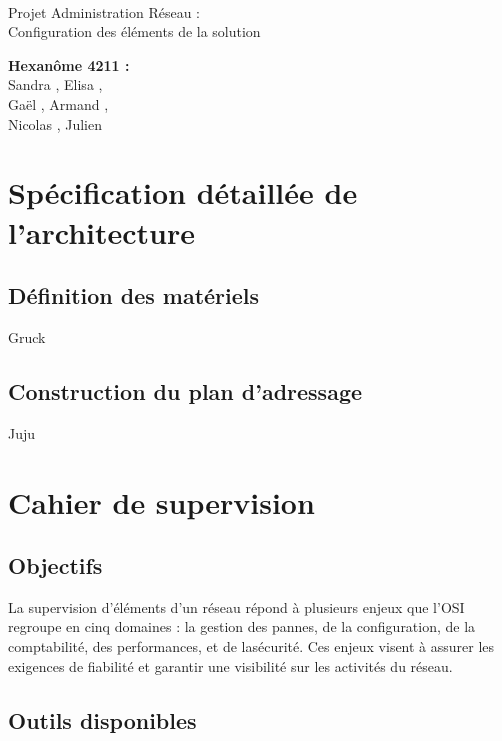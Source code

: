 \documentclass[a4paper]{article}
\begin{document}
\begin{titlepage}
	~ 
	\vfill
	\begin{center}
		\begin{Huge}
			Projet Administration Réseau : \\ Configuration des éléments de la solution\\
		\end{Huge}
	\vfill
		\textbf{Hexanôme 4211 :} 
			\\Sandra {}, Elisa , 
			\\Gaël , Armand , 
			\\Nicolas {}, Julien \\
	\vfill
	\end{center}
	\vfill
\end{titlepage}

\newpage
\tableofcontents
\newpage

\section{Spécification détaillée de l'architecture}
	\subsection{Définition des matériels}
	Gruck
	
	\subsection{Construction du plan d'adressage}
	Juju
	
\section{Cahier de supervision}

\subsection{Objectifs}
La supervision d'éléments d'un réseau répond à plusieurs enjeux que l'OSI regroupe en cinq domaines : la gestion des pannes, de la configuration, de la comptabilité, des performances, et de lasécurité. Ces enjeux visent à assurer les exigences de fiabilité et garantir une visibilité sur les activités du réseau.  

\subsection{Outils disponibles}
\end{document}

